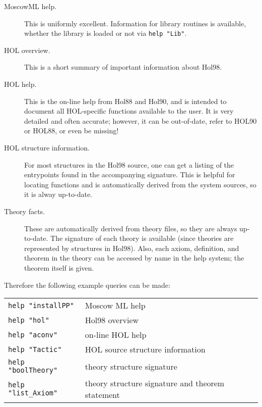  \begin{description}

 \item [MoscowML help.] This is uniformly excellent. Information for
   library routines is available, whether the library is loaded or not
   via \verb+help "Lib"+.

\item [HOL overview.] This is a short summary of important information
  about Hol98.

\item [HOL help.] This is the on-line help from Hol88 and Hol90, and
  is intended to document all HOL-specific functions available to the
  user. It is very detailed and often accurate; however, it can be
  out-of-date, refer to HOL90 or HOL88, or even be missing!

\item [HOL structure information.]  For most structures in the Hol98
  source, one can get a listing of the entrypoints found in the
  accompanying signature. This is helpful for locating functions and
  is automatically derived from the system sources, so it is alway
  up-to-date.

\item [Theory facts.] These are automatically derived from theory
  files, so they are always up-to-date. The signature of each theory
  is available (since theories are represented by structures in
  Hol98). Also, each axiom, definition, and theorem in the theory can
  be accessed by name in the help system; the theorem itself is given.
 \end{description}

 Therefore the following example queries can be made:

 \begin{table}[h]
\begin{center}
 \begin{tabular}{|l|l|} \hline
  \verb+help "installPP"+ & Moscow ML help \\
  \verb+help "hol"+ &  Hol98 overview \\
  \verb+help "aconv"+ &  on-line HOL help \\
  \verb+help "Tactic"+ & HOL source structure information \\
  \verb+help "boolTheory"+ &  theory structure signature \\
  \verb+help "list_Axiom"+ & theory structure signature and theorem
 statement \\ \hline
 \end{tabular}
\end{center}
 \end{table}

